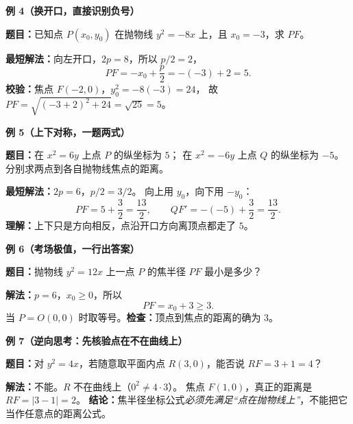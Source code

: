 \begin{examplebox}
  \medskip
  \textbf{\textcolor{CExample}{例 4（换开口，直接识别负号）}}

  \textbf{题目：}已知点 $P(x_0,y_0)$ 在抛物线 $y^2=-8x$ 上，且 $x_0=-3$，求 $PF$。

  \textbf{最短解法：}向左开口，$2p=8$，所以 $p/2=2$，
  \[
    PF=-x_0+\frac p2=-(-3)+2=\boxed{5}.
  \]
  \textbf{校验：}焦点 $F(-2,0)$，$y_0^2=-8(-3)=24$，
  故 $PF=\sqrt{(-3+2)^2+24}=\sqrt{25}=5$。

  \medskip
  \textbf{\textcolor{CExample}{例 5（上下对称，一题两式）}}

  \textbf{题目：}在 $x^2=6y$ 上点 $P$ 的纵坐标为 $5$；
  在 $x^2=-6y$ 上点 $Q$ 的纵坐标为 $-5$。
  分别求两点到各自抛物线焦点的距离。

  \textbf{最短解法：}$2p=6$，$p/2=3/2$。
  向上用 $y_0$，向下用 $-y_0$：
  \[
    PF=5+\frac32=\boxed{\frac{13}{2}},\qquad
    QF'=-(-5)+\frac32=\boxed{\frac{13}{2}}.
  \]
  \textbf{理解：}上下只是方向相反，点沿开口方向离顶点都走了 $5$。

  \medskip
  \textbf{\textcolor{CExample}{例 6（考场极值，一行出答案）}}

  \textbf{题目：}抛物线 $y^2=12x$ 上一点 $P$ 的焦半径 $PF$ 最小是多少？

  \textbf{解法：}$p=6$，$x_0\ge0$，所以
  \[
    PF=x_0+3\ge\boxed{3}.
  \]
  当 $P=O(0,0)$ 时取等号。\textbf{检查：}顶点到焦点的距离的确为 $3$。

  \medskip
  \textbf{\textcolor{CExample}{例 7（逆向思考：先核验点在不在曲线上）}}

  \textbf{题目：}对 $y^2=4x$，若随意取平面内点 $R(3,0)$，能否说 $RF=3+1=4$？

  \textbf{解法：}不能。$R$ 不在曲线上（$0^2\ne4\cdot3$）。
  焦点 $F(1,0)$，真正的距离是 $RF=|3-1|=\boxed{2}$。
  \textbf{结论：}焦半径坐标公式\emph{必须先满足“点在抛物线上”}，不能把它当作任意点的距离公式。
\end{examplebox}
